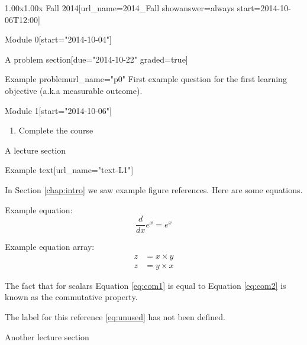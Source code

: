 \documentclass[12pt]{article}
\begin{document}
\begin{edXcourse}{1.00x}{1.00x Fall 2014}[url_name=2014_Fall showanswer=always start=2014-10-06T12:00]
\begin{edXchapter*}{Module 0}[start="2014-10-04"]
\begin{edXsequential}{A problem section}[due="2014-10-22" graded=true]
\begin{edXproblem}{Example problem}{url_name="p0"}
First example question for the first learning objective (a.k.a measurable outcome).

\end{edXproblem}

\end{edXsequential}

\end{edXchapter*}

\begin{edXchapter}{Module 1}[start="2014-10-06"]

\begin{enumerate}
  \item {} Complete the course
\end{enumerate}

\begin{edXsequential}{A lecture section}
\label{sec:lecture1}

\begin{edXtext}{Example text}[url_name="text-L1"]
 

In Section \ref{chap:intro} we saw example figure references.  Here are some equations.

Example equation:
\begin{equation}
  \frac{d}{dx} e^x = e^x
  \label{eq:deriv}
\end{equation}

Example equation array:
\begin{eqnarray}
  z & = x \times y \label{eq:com1}\\
  z & = y \times x \label{eq:com2}
\end{eqnarray}

The fact that for scalars Equation \ref{eq:com1} is equal to Equation \ref{eq:com2} is known as the commutative property.

The label for this reference \ref{eq:unused} has not been defined.

\end{edXtext}

\end{edXsequential}

\begin{edXsequential}{Another lecture section}


\end{edXsequential}
\end{edXchapter}
\end{edXcourse}
\end{document}
